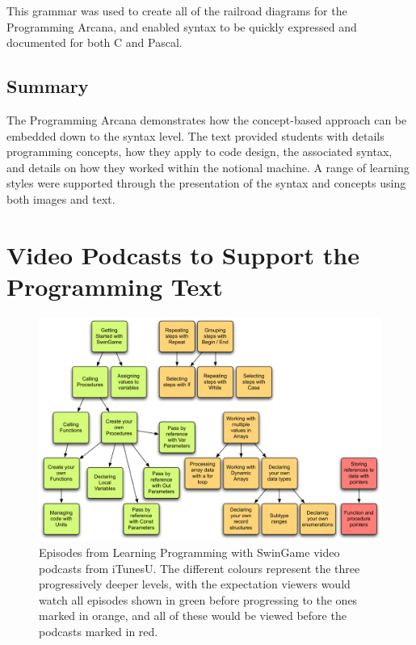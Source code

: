 This grammar was used to create all of the railroad diagrams for the Programming Arcana, and enabled syntax to be quickly expressed and documented for both C and Pascal.


\subsection{Summary} %
\label{ssub:arcana_summary}

The Programming Arcana demonstrates how the concept-based approach can be embedded down to the syntax level. The text provided students with details programming concepts, how they apply to code design, the associated syntax, and details on how they worked within the notional machine. A range of learning styles were supported through the presentation of the syntax and concepts using both images and text. 




\section{Video Podcasts to Support the Programming Text} %
\label{sec:vodcasts}




\begin{figure}[thb]
  \centering
  \includegraphics[width=\textwidth]{PodCasts1}
  \caption{Episodes from Learning Programming with SwinGame video podcasts from iTunesU. The different colours represent the three progressively deeper levels, with the expectation viewers would watch all episodes shown in green before progressing to the ones marked in orange, and all of these would be viewed before the podcasts marked in red.}
  \label{fig:podcasts}
\end{figure}

